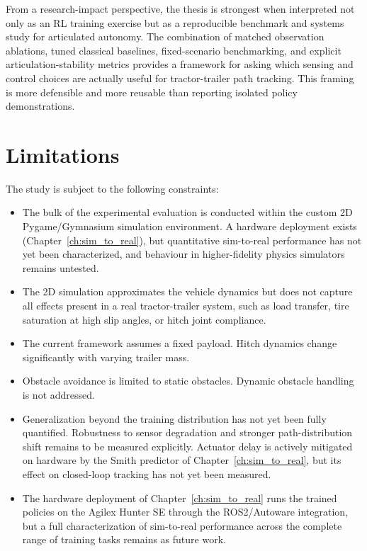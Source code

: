 From a research-impact perspective, the thesis is strongest when interpreted not only as an RL training exercise but as a reproducible benchmark and systems study for articulated autonomy. The combination of matched observation ablations, tuned classical baselines, fixed-scenario benchmarking, and explicit articulation-stability metrics provides a framework for asking which sensing and control choices are actually useful for tractor-trailer path tracking. This framing is more defensible and more reusable than reporting isolated policy demonstrations.

\section{Limitations}

The study is subject to the following constraints:
\begin{itemize}
    \item The bulk of the experimental evaluation is conducted within the custom 2D Pygame/Gymnasium simulation environment. A hardware deployment exists (Chapter~\ref{ch:sim_to_real}), but quantitative sim-to-real performance has not yet been characterized, and behaviour in higher-fidelity physics simulators remains untested.
    \item The 2D simulation approximates the vehicle dynamics but does not capture all effects present in a real tractor-trailer system, such as load transfer, tire saturation at high slip angles, or hitch joint compliance.
    \item The current framework assumes a fixed payload. Hitch dynamics change significantly with varying trailer mass.
    \item Obstacle avoidance is limited to static obstacles. Dynamic obstacle handling is not addressed.
    \item Generalization beyond the training distribution has not yet been fully quantified. Robustness to sensor degradation and stronger path-distribution shift remains to be measured explicitly. Actuator delay is actively mitigated on hardware by the Smith predictor of Chapter~\ref{ch:sim_to_real}, but its effect on closed-loop tracking has not yet been measured.
    \item The hardware deployment of Chapter~\ref{ch:sim_to_real} runs the trained policies on the Agilex Hunter SE through the ROS2/Autoware integration, but a full characterization of sim-to-real performance across the complete range of training tasks remains as future work.
\end{itemize}

